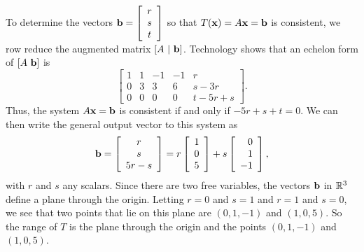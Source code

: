 \begin{example}
\item To determine the vectors $\mathbf{b} = \left[ \begin{array}{c} r\\s\\t \end{array} \right]$ so that $T(\mathbf{x}) = A\mathbf{x} = \mathbf{b}$ is consistent, we row reduce the augmented matrix $[A \ | \  \mathbf{b}]$. Technology shows that an echelon form of $[A \ \mathbf{b}]$ is 
\[\left[ \begin{array}{ccrr|c} 1&1&-1&-1&r \\ 0&3&3&6&s-3r \\ 0&0&0&0&t-5r+s \end{array} \right].\]
Thus, the system $A \mathbf{x} = \mathbf{b}$ is consistent if and only if $- 5r+s+t = 0$. We can then write the general output vector to this system as 
\[\mathbf{b} = \left[ \begin{array}{c} r\\s\\5r-s \end{array} \right] = r\left[ \begin{array}{c} 1\\0\\5\end{array} \right] + s\left[ \begin{array}{r} 0\\1\\-1 \end{array} \right],\]
with $r$ and $s$ any scalars. Since there are two free variables, the vectors $\mathbf{b}$ in $\mathbb{R}^3$ define a plane through the origin. Letting $r=0$ and $s=1$ and $r=1$ and $s=0$, we see that two points that lie on this plane are $(0,1,-1)$ and $(1,0,5)$. So the range of $T$ is the plane through the origin and the points $(0,1,-1)$ and $(1,0,5)$.

\ea

	

\end{example}

